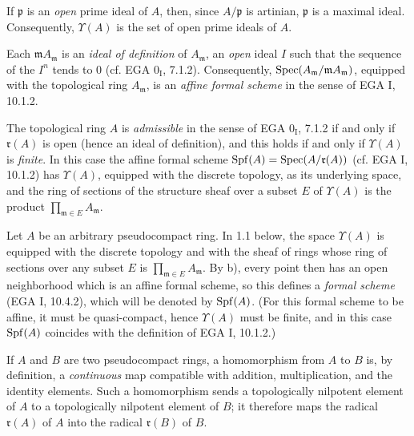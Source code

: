 \begin{remarks}{}
\begin{enumeratea}
\item If $\mathfrak p$ is an \emph{open} prime ideal of $A$, then, since $A/\mathfrak p$ is artinian, $\mathfrak p$ is a maximal ideal. Consequently, $\Upsilon(A)$ is the set of open prime ideals of $A$.
\item Each $\mathfrak m A_{\mathfrak m}$ is an \emph{ideal of definition} of $A_{\mathfrak m}$, \ie an \emph{open} ideal $I$ such that the sequence of the $I^n$ tends to $0$ (cf. EGA $0_{\mathrm I}$, 7.1.2). Consequently, $\operatorname{Spec}(A_{\mathfrak m}/\mathfrak m A_{\mathfrak m})$, equipped with the topological ring $A_{\mathfrak m}$, is an \emph{affine formal scheme} in the sense of EGA I, 10.1.2.
\item The topological ring $A$ is \emph{admissible} in the sense of EGA $0_{\mathrm I}$, 7.1.2 if and only if $\mathfrak r(A)$ is open (hence an ideal of definition), and this holds if and only if $\Upsilon(A)$ is \emph{finite}. In this case the affine formal scheme $\operatorname{Spf}(A)=\operatorname{Spec}(A/\mathfrak r(A))$ (cf. EGA I, 10.1.2) has $\Upsilon(A)$, equipped with the discrete topology, as its underlying space, and the ring of sections of the structure sheaf over a subset $E$ of $\Upsilon(A)$ is the product $\prod_{\mathfrak m\in E}A_{\mathfrak m}$.
\item Let $A$ be an arbitrary pseudocompact ring. In 1.1 below, the space $\Upsilon(A)$ is equipped with the discrete topology and with the sheaf of rings whose ring of sections over any subset $E$ is $\prod_{\mathfrak m\in E}A_{\mathfrak m}$. By b), every point then has an open neighborhood which is an affine formal scheme, so this defines a \emph{formal scheme} (EGA I, 10.4.2), which will be denoted by $\operatorname{Spf}(A)$. (For this formal scheme to be affine, it must be quasi-compact, hence $\Upsilon(A)$ must be finite, and in this case $\operatorname{Spf}(A)$ coincides with the definition of EGA I, 10.1.2.)
\end{enumeratea}
\end{remarks}

If $A$ and $B$ are two pseudocompact rings, a homomorphism from $A$ to $B$ is, by definition, a \emph{continuous} map compatible with addition, multiplication, and the identity elements. Such a homomorphism sends a topologically nilpotent element of $A$ to a topologically nilpotent element of $B$; it therefore maps the radical $\mathfrak r(A)$ of $A$ into the radical $\mathfrak r(B)$ of $B$.

